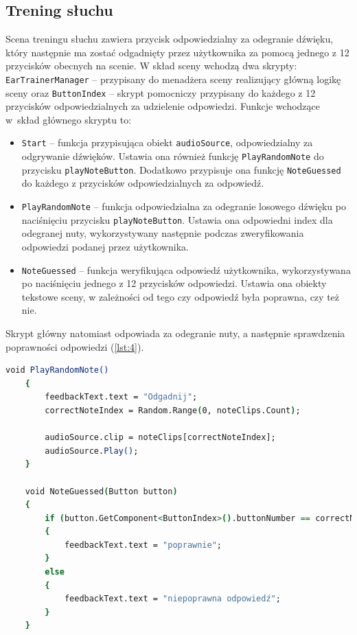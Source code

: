 \subsection{Trening słuchu}

Scena treningu słuchu zawiera przycisk odpowiedzialny za odegranie dźwięku, który następnie ma zostać odgadnięty przez użytkownika za pomocą jednego z 12 przycisków obecnych na scenie. W skład sceny wchodzą dwa skrypty: \texttt{EarTrainerManager} -- przypisany do menadżera sceny realizujący główną logikę sceny oraz \texttt{ButtonIndex} -- skrypt pomocniczy przypisany do każdego z 12 przycisków odpowiedzialnych za udzielenie odpowiedzi. Funkcje wchodzące w~skład głównego skryptu to:
\begin{itemize}
    \item \texttt{Start} -- funkcja przypisująca obiekt \texttt{audioSource}, odpowiedzialny za odgrywanie dźwięków. Ustawia ona również funkcję \texttt{PlayRandomNote} do przycisku \texttt{playNoteButton}. Dodatkowo przypisuje ona funkcję \texttt{NoteGuessed} do każdego z przycisków odpowiedzialnych za odpowiedź.
    \item \texttt{PlayRandomNote} -- funkcja odpowiedzialna za odegranie losowego dźwięku po naciśnięciu przycisku \texttt{playNoteButton}. Ustawia ona odpowiedni index dla odegranej nuty, wykorzystywany następnie podczas zweryfikowania odpowiedzi podanej przez użytkownika.
    \item \texttt{NoteGuessed} -- funkcja weryfikująca odpowiedź użytkownika, wykorzystywana po naciśnięciu jednego z 12 przycisków odpowiedzi. Ustawia ona obiekty tekstowe sceny, w zależności od tego czy odpowiedź była poprawna, czy też nie. 
\end{itemize}

Skrypt główny natomiast odpowiada za odegranie nuty, a następnie sprawdzenia poprawności odpowiedzi (\ref{lst:4}).

\begin{lstlisting}[language=csh,caption=Funkcje \texttt{PlayRandomNote} i \texttt{NoteGuessed}, label=lst:4]
    void PlayRandomNote()
    {
        feedbackText.text = "Odgadnij"; 
        correctNoteIndex = Random.Range(0, noteClips.Count);
        
        audioSource.clip = noteClips[correctNoteIndex];
        audioSource.Play();
    }

    void NoteGuessed(Button button)
    {
        if (button.GetComponent<ButtonIndex>().buttonNumber == correctNoteIndex)
        {
            feedbackText.text = "poprawnie";
        }
        else
        {
            feedbackText.text = "niepoprawna odpowiedź";
        }
    }
\end{lstlisting}

